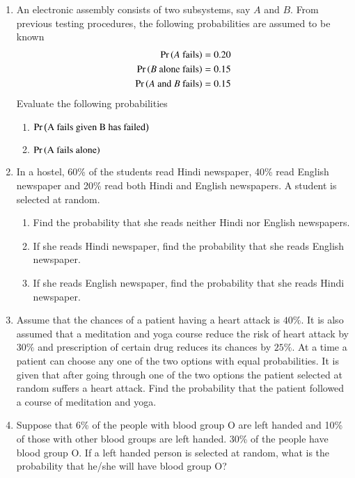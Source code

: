 \begin{enumerate}[label=\thesubsection.\arabic*,ref=\thesubsection.\theenumi,resume*]
	\item An electronic assembly consists of two subsystems, say $A$ and $B$. From previous testing procedures, the following probabilities are assumed to be known
\begin{align}
\Pr\left(A\text{ fails}\right)&=0.20
\\ \Pr\left(B\text{ alone fails}\right)&=0.15
	\\ \Pr\left(A\text{ and }B \text{ fails}\right)&=0.15
\end{align}
 Evaluate the following probabilities
 \begin{enumerate}
 \item $\Pr\left(\text{A fails given B has failed}\right)$
 \item $\Pr\left(\text{A fails alone}\right)$
\end{enumerate}
		\solution
		
  \item
  In a hostel, 60\% of the students read Hindi newspaper, 40\% read English
newspaper and 20\% read both Hindi and English newspapers. A student is
selected at random.
\begin{enumerate}
\item Find the probability that she reads neither Hindi nor English newspapers.
\item If she reads Hindi newspaper, find the probability that she reads English
newspaper.
\item If she reads English newspaper, find the probability that she reads Hindi
newspaper.
\end{enumerate}
\solution

	\item Assume that the chances of a patient having a heart attack is $40\%$. It is also assumed that a meditation and yoga course reduce the risk of heart attack by $30\%$ and prescription of certain drug reduces its chances by $25\%$. At a time a patient can choose any one of the two options with equal probabilities. It is given that after going through one of the two options the patient selected at random suffers a heart attack. Find the probability that the patient followed a course of meditation and yoga.
	\\
		\solution
		
\item Suppose that 6\% of the people with blood group O are left handed and 10\% of those with other blood groups are left handed. 30\% of the people have blood group O. If a left handed person is selected at random, what is the probability that he/she will have blood group O?

\end{enumerate}
